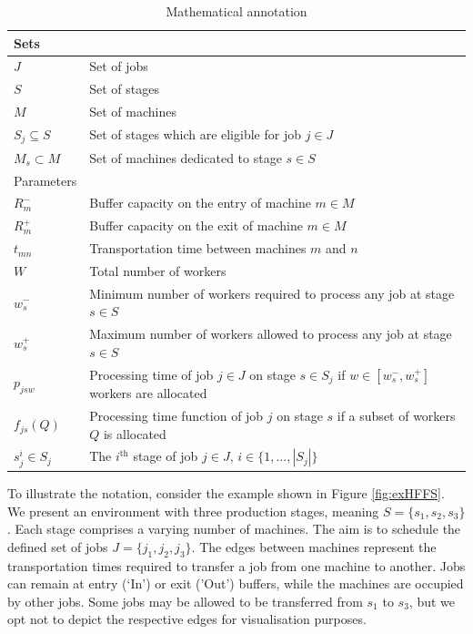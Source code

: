 \documentclass[a4paper,final]{article}
\begin{document}
        \begin{table}[H]
            \centering
            \caption{Mathematical annotation}\label{tab:notation}
            \begin{tabular}{|l l|}
            \hline
            Sets &  \\
            \hline
            $J$ &   Set of jobs \\
            $S$ &   Set of stages \\
            $M$ &   Set of machines \\
            $S_{j}\subseteq S$  & Set of stages which are eligible for job $j\in J$ \\
            $M_{s}\subset M$ & Set of machines dedicated to stage $s\in S$ \\
            \hline
            Parameters &   \\
            \hline
            $R^{-}_{m}$ &  Buffer capacity on the entry of machine $m\in M$ \\
            $R^{+}_{m}$ &  Buffer capacity on the exit of machine $m\in M$ \\
            $t_{mn}$    & Transportation time between machines $m$ and $n$ \\
            $W$ & Total number of workers \\
            $w^-_{s}$ & Minimum number of workers required to process any job at stage $s\in S$ \\
            $w^+_{s}$ & Maximum number of workers allowed to process any job at stage $s\in S$ \\
            $p_{jsw}$ &  Processing time of job $j\in J$ on stage $s\in S_{j}$ if $w\in [w^{-}_{s}, w^{+}_{s}]$ workers are allocated \\
            $f_{js}(Q)$ &  Processing time function of job $j$ on stage $s$ if a subset of workers $Q$ is allocated \\
            $s^{i}_{j}\in S_{j}$ & The $i^{\text{th}}$ stage of job $j\in J$, $i\in \{1, ..., |S_{j}|\}$ \\
            \hline
        \end{tabular}
        \end{table}

        To illustrate the notation, consider the example shown in Figure \ref{fig:exHFFS}. We present an environment with three production stages, meaning $S = \{s_1, s_2, s_3\}$. Each stage comprises a varying number of machines. The aim is to schedule the defined set of jobs $J = \{j_1, j_2, j_3\}$. The edges between machines represent the transportation times required to transfer a job from one machine to another. Jobs can remain at entry (`In') or exit ('Out') buffers, while the machines are occupied by other jobs. Some jobs may be allowed to be transferred from $s_1$ to $s_3$, but we opt not to depict the respective edges for visualisation purposes.
\end{document}
